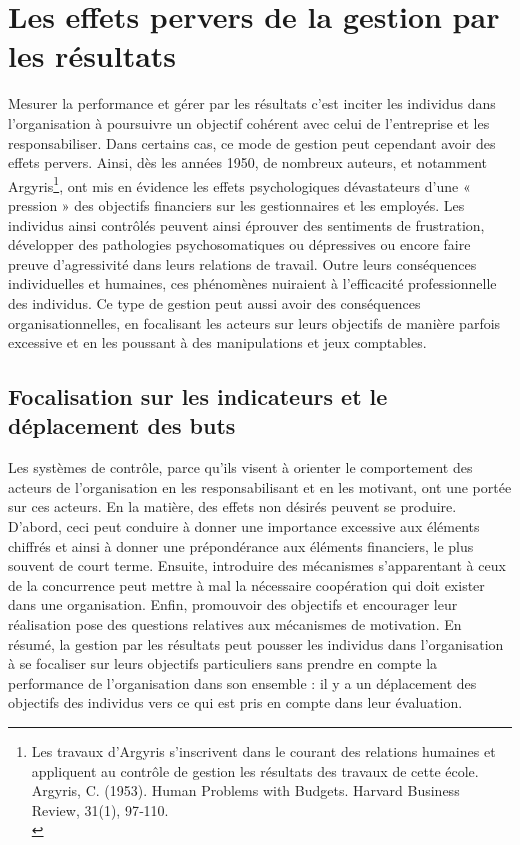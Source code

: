 \documentclass{kaobook}
\begin{document}
\section{Les effets pervers de la gestion par les résultats}
\label{sec:orgb44c9d4}
Mesurer la performance et gérer par les résultats c’est inciter les individus dans l’organisation à poursuivre un objectif cohérent avec celui de l’entreprise et les responsabiliser. Dans certains cas, ce mode de gestion peut cependant avoir des effets pervers. Ainsi, dès les années 1950, de nombreux auteurs, et notamment Argyris\footnote{Les travaux d’Argyris s’inscrivent dans le courant des relations humaines et appliquent au contrôle de gestion les résultats des travaux de cette école. Argyris, C. (1953). Human Problems with Budgets. Harvard Business Review, 31(1), 97‑110.\\}, ont mis en évidence les effets psychologiques dévastateurs d’une « pression » des objectifs financiers sur les gestionnaires et les employés. Les individus ainsi contrôlés peuvent ainsi éprouver des sentiments de frustration, développer des pathologies psychosomatiques ou dépressives ou encore faire preuve d’agressivité dans leurs relations de travail. Outre leurs conséquences individuelles et humaines, ces phénomènes nuiraient à l’efficacité professionnelle des individus. Ce type de gestion peut aussi avoir des conséquences organisationnelles, en focalisant les acteurs sur leurs objectifs de manière parfois excessive et en les poussant à des manipulations et jeux comptables.\\
\subsection{Focalisation sur les indicateurs et le déplacement des buts}
\label{sec:orgbb7272c}
Les systèmes de contrôle, parce qu’ils visent à orienter le comportement des acteurs de l’organisation en les responsabilisant et en les motivant, ont une portée sur ces acteurs. En la matière, des effets non désirés peuvent se produire. D’abord, ceci peut conduire à donner une importance excessive aux éléments chiffrés et ainsi à donner une prépondérance aux éléments financiers, le plus souvent de court terme. Ensuite, introduire des mécanismes s’apparentant à ceux de la concurrence peut mettre à mal la nécessaire coopération qui doit exister dans une organisation. Enfin, promouvoir des objectifs et encourager leur réalisation pose des questions relatives aux mécanismes de motivation. En résumé, la gestion par les résultats peut pousser les individus dans l’organisation à se focaliser sur leurs objectifs particuliers sans prendre en compte la performance de l’organisation dans son ensemble : il y a un déplacement des objectifs des individus vers ce qui est pris en compte dans leur évaluation.\\
\end{document}
